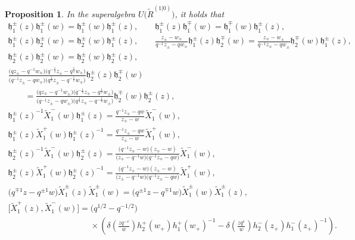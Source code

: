 \documentclass[10pt,a4paper]{amsart}
\numberwithin{equation}{section}
\newtheorem{Proposition}[Theorem]{Proposition}
 { \theoremstyle{definition}
\newtheorem{Definition}[Theorem]{Definition}
\newtheorem{Note}[Theorem]{Note}
\newtheorem{Example}[Theorem]{Example}
\newtheorem{Remark}[Theorem]{Remark} }
\begin{document}
\begin{Proposition}In the superalgebra $U\bigl(\widetilde{R}^{(1|0)}\bigr)$, it holds that
\begin{gather*}
 \mathfrak{h}_1^{\pm}(z)\mathfrak{h}_1^{\pm}(w)=\mathfrak{h}_1^{\pm}(w)\mathfrak{h}_1^{\pm}(z),\qquad
 \mathfrak{h}_1^{\pm}(z)\mathfrak{h}_1^{\mp}(w)=\mathfrak{h}_1^{\mp}(w)\mathfrak{h}_1^{\pm}(z),\\
 \mathfrak{h}_1^{\pm}(z)\mathfrak{h}_2^{\pm}(w)=\mathfrak{h}_2^{\pm}(w)\mathfrak{h}_1^{\pm}(z),\qquad
 \frac{z_{\pm}-w_{\mp}}{q^{-1}z_{\pm}-qw_{\mp}}
 \mathfrak{h}_1^{\pm}(z)\mathfrak{h}_2^{\mp}(w)=\frac{z_{\mp}-w_{\pm}}{q^{-1}z_{\mp}-qw_{\pm}}
 \mathfrak{h}_2^{\mp}(w)\mathfrak{h}_1^{\pm}(z),\\
 \mathfrak{h}_2^{\pm}(z)\mathfrak{h}_2^{\pm}(w)=\mathfrak{h}_2^{\pm}(w)\mathfrak{h}_2^{\pm}(z),\\
 \frac{\bigl(qz_{\pm}-q^{-1}w_{\mp}\bigr)\bigl(q^{-\frac{1}{2}}z_{\pm}-q^{\frac{1}{2}}w_{\mp}\bigr)}{\bigl(q^{-1}z_{\pm}-qw_{\mp}\bigr)
 \bigl(q^{\frac{1}{2}}z_{\pm}-q^{-\frac{1}{2}}w_{\mp}\bigr)}\mathfrak{h}_2^{\pm}(z)\mathfrak{h}_2^{\mp}(w)\\
 \qquad
 =\frac{\bigl(qz_{\mp}-q^{-1}w_{\pm}\bigr)\bigl(q^{-\frac{1}{2}}z_{\mp}-q^{\frac{1}{2}}w_{\pm}\bigr)}{\bigl(q^{-1}z_{\pm}-qw_{\pm}\bigr)
 \bigl(q^{\frac{1}{2}}z_{\mp}-q^{-\frac{1}{2}}w_{\pm}\bigr)}\mathfrak{h}_2^{\mp}(w)\mathfrak{h}_2^{\pm}(z),\\
 {\mathfrak{h}_1^{\pm}(z)}^{-1}\widetilde{X}^-_1(w)\mathfrak{h}_1^{\pm}(z)=\frac{q^{-1}z_{\mp}-qw}{z_{\mp}-w}\widetilde{X}^-_1(w),\\
 \mathfrak{h}_1^{\pm}(z)\widetilde{X}^+_1(w){\mathfrak{h}_1^{\pm}(z)}^{-1}=\frac{q^{-1}z_{\pm}-qw}{z_{\pm}-w}\widetilde{X}^+_1(w),
\\
 {\mathfrak{h}_{2}^{\pm}(z)}^{-1}\widetilde{X}_{1}^-(w)\mathfrak{h}_{2}^{\pm}(z)=\frac{\bigl(q^{-1}z_{\mp}-w\bigr)(z_{\mp}-w)}
 {\bigl(z_{\mp}-q^{-1}w\bigr)\bigl(q^{-1}z_{\mp}-qw\bigr)}\widetilde{X}_{1}^-(w),\\
 \label{dr9}
 \mathfrak{h}_{2}^{\pm}(z)\widetilde{X}_{1}^+(w){\mathfrak{h}_{2}^{\pm}(z)}^{-1}=\frac{\bigl(q^{-1}z_{\pm}-w\bigr)(z_{\pm}-w)}
 {\bigl(z_{\pm}-q^{-1}w\bigr)\bigl(q^{-1}z_{\pm}-qw\bigr)}\widetilde{X}_{1}^+(w),\\
\label{dr10}
 \bigl(q^{\mp1}z-q^{\pm1}w\bigr)\widetilde{X}_1^{\pm}(z)\widetilde{X}_1^{\pm}(w)=\bigl(q^{\pm1}z-q^{\mp1}w\bigr)\widetilde{X}_1^{\pm}(w)\widetilde{X}_1^{\pm}(z),\\
 \bigl[\widetilde{X}_1^{+}(z), \widetilde{X}_1^{-}(w)\bigr]=\bigl(q^{1/2}-q^{-1/2}\bigr)\\
 \phantom{ \bigl[\widetilde{X}_1^{+}(z), \widetilde{X}_1^{-}(w)\bigr]=}{}\times\left(\delta\left(\frac{zq^{-c}}{w}\right)h_{2}^+(w_+)h_1^+(w_+)^{-1}
 -\delta\left(\frac{zq^{c}}{w}\right)h_{2}^-(z_+)h_1^-(z_+)^{-1}\right).
\end{gather*}
\end{Proposition}
\end{document}
